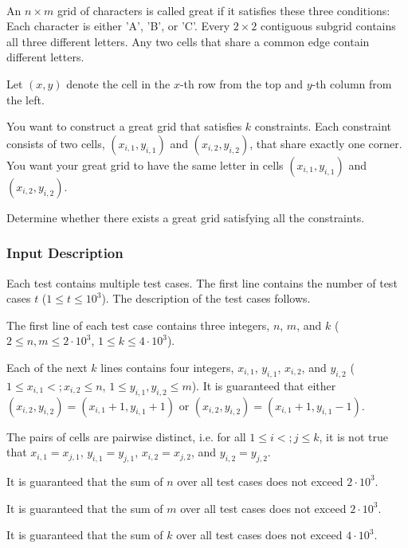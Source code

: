 \documentclass{article}
\begin{document}
\paragraph{}An $n \times m$ grid of characters is called great if it satisfies these three conditions:   Each character is either 'A', 'B', or 'C'.  Every $2 \times 2$ contiguous subgrid contains all three different letters.  Any two cells that share a common edge contain different letters. 

Let $(x,y)$ denote the cell in the $x$-th row from the top and $y$-th column from the left.

You want to construct a great grid that satisfies $k$ constraints. Each constraint consists of two cells, $(x_{i,1},y_{i,1})$ and $(x_{i,2},y_{i,2})$, that share exactly one corner. You want your great grid to have the same letter in cells $(x_{i,1},y_{i,1})$ and $(x_{i,2},y_{i,2})$.

Determine whether there exists a great grid satisfying all the constraints.
\paragraph{}
\subsubsection*{Input Description}Each test contains multiple test cases. The first line contains the number of test cases $t$ ($1 \le t \le 10^3$). The description of the test cases follows.

The first line of each test case contains three integers, $n$, $m$, and $k$ ($2 \le n,m \le 2 \cdot 10^3$, $1 \le k \le 4 \cdot 10^3$).

Each of the next $k$ lines contains four integers, $x_{i,1}$, $y_{i,1}$, $x_{i,2}$, and $y_{i,2}$ ($1 \le x_{i,1} <; x_{i,2} \le n$, $1 \le y_{i,1},y_{i,2} \le m$). It is guaranteed that either $(x_{i,2},y_{i,2}) = (x_{i,1}+1,y_{i,1}+1)$ or $(x_{i,2},y_{i,2}) = (x_{i,1}+1,y_{i,1}-1)$.

The pairs of cells are pairwise distinct, i.e. for all $1 \le i <; j \le k$, it is not true that $x_{i,1} = x_{j,1}$, $y_{i,1} = y_{j,1}$, $x_{i,2} = x_{j,2}$, and $y_{i,2} = y_{j,2}$.

It is guaranteed that the sum of $n$ over all test cases does not exceed $2 \cdot 10^3$.

It is guaranteed that the sum of $m$ over all test cases does not exceed $2 \cdot 10^3$.

It is guaranteed that the sum of $k$ over all test cases does not exceed $4 \cdot 10^3$.
\end{document}
